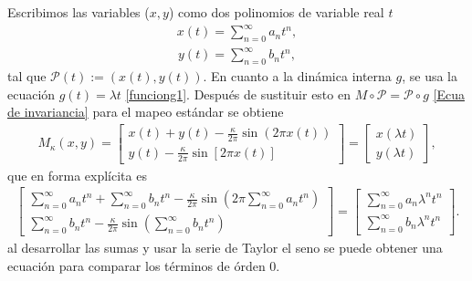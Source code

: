 Escribimos las variables ($x,y$) como dos polinomios de variable real $t$
\begin{eqnarray}
x(t)=\sum_{n=0}^{\infty}a_{n}t^{n}  ,
\label{x}
\end{eqnarray}
\begin{eqnarray}
y(t)=\sum_{n=0}^{\infty}b_{n}t^{n},
\label{y}
\end{eqnarray}
tal que $\mathcal{P}(t):=(x(t),y(t))$. En cuanto a la dinámica interna $g$, se usa la ecuación $g(t)=\lambda t$ \eqref{funciong1}. Después de sustituir esto en $M\circ\mathcal{P}=\mathcal{P}\circ g$ \eqref{Ecua de invariancia} para el mapeo estándar se obtiene
\begin{eqnarray}
M_{\kappa}(x,y) = \left[\begin{array}{c}
x(t) + y(t) -\frac{\kappa}{2\pi}\sin(2\pi x(t)) \\
y(t) - \frac{\kappa}{2\pi}\sin[2\pi x(t)]
\end{array}\right] =\left[ \begin{array}{c}
x(\lambda t) \\
y(\lambda t)
\end{array}\right], 
\label{sumas en mapeo}
\end{eqnarray}
que en forma explícita es
\begin{eqnarray}
\left[\begin{array}{c}
\sum_{n=0}^{\infty}a_{n}t^{n} + \sum_{n=0}^{\infty}b_{n}t^{n} -\frac{\kappa}{2\pi}\sin\left(2\pi \sum_{n=0}^{\infty}a_{n}t^{n}\right)\\
\sum_{n=0}^{\infty}b_{n}t^{n} - \frac{\kappa}{2\pi}\sin(\sum_{n=0}^{\infty}b_{n}t^{n})
\end{array}\right] =\left[ \begin{array}{c}
\sum_{n=0}^{\infty}a_{n}\lambda^{n}t^{n} \\
\sum_{n=0}^{\infty}b_{n}\lambda^{n}t^{n}
\end{array}\right].
\label{expandida}
\end{eqnarray}
al desarrollar las sumas y usar la serie de Taylor el seno se puede obtener una ecuaci\'on para comparar los t\'erminos de \'orden 0. 

